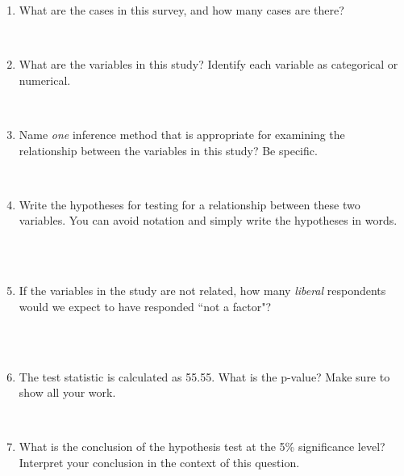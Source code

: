\documentclass[11pt]{article}
\newcommand{\soln}[2]{$\:$\\ \vspace{#1}}{}
\begin{document}
\begin{enumerate}
\begin{enumerate}

\item What are the cases in this survey, and how many cases are there?

\soln{1cm}{Cases in this study are 738 randomly selected Florida residents.}

\item What are the variables in this study? Identify each variable as categorical or numerical.

\soln{2cm}{Variable 1: political ideology (categorical) \\
Variable 2: degree to which the respondent thinks the victim's race was a major factor in this shooting (categorical, ordinal)}

\item Name \emph{one} inference method that is appropriate for examining the relationship between the 
variables in this study? Be specific.

\soln{1cm}{Chi-squared test of independence.}

\item Write the hypotheses for testing for a relationship between these two variables. You can avoid notation 
and simply write the hypotheses in words.

\soln{3cm}{$H_0$: Political ideology and the degree to which Florida residents think the victim's race was a major factor in 
this shooting are independent of each other. \\
$H_A$: Political ideology and the degree to which Florida residents think the victim's race was a major factor in this 
shooting are associated.
}
$\:$

\item If the variables in the study are not related, how many \emph{liberal} respondents would we expect to 
have responded ``not a factor"?

\soln{2cm}{\[ E_{\text{not a factor, liberal}} = \frac{124 \times 155}{738} = 26.04 \approx 26 \]}
$\:$

\item The test statistic is calculated as 55.55. What is the p-value? Make sure to show all your work.

\soln{1cm}{$df = (R - 1) \times (C - 1) = 3 \times 2 = 6$, p-value is less than 0.001.}

\item What is the conclusion of the hypothesis test at the 5\% significance level? Interpret your conclusion 
in the context of this question.


\end{enumerate}
\end{enumerate}
\end{document}
